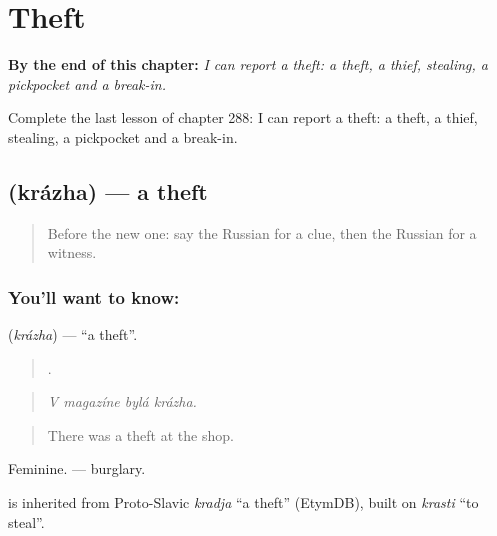 
\chapter{Theft}
\label{ch:ru-theft}

\begin{chapteropening}
\textbf{By the end of this chapter:} \emph{I can report a theft: a theft, a thief, stealing, a pickpocket and a break-in.}

Complete the last lesson of chapter 288: I can report a theft: a theft, a thief, stealing, a pickpocket and a break-in.
\end{chapteropening}

\section[\texorpdfstring{\ru{кража} (krázha)}{кража (krázha)}]{ (krázha) — a theft}

\label{lesson:RU-C288-krazha}



\begin{quote}
Before the new one: say the Russian for a clue, then the Russian for a witness.
\end{quote}

\subsection*{You'll want to know: }
\textbf{} (\emph{krázha}) — \textquotedblleft{}a theft\textquotedblright{}.

\begin{quote}
   .
\end{quote}

\begin{quote}
\emph{V magazíne bylá krázha.}
\end{quote}

\begin{quote}
There was a theft at the shop.
\end{quote}

Feminine. \emph{  } — burglary.

\begin{cousinweb}
\emph{} is inherited from Proto-Slavic \emph{kradja} \textquotedblleft{}a theft\textquotedblright{} (EtymDB), built on \emph{krasti} \textquotedblleft{}to steal\textquotedblright{}.
\end{cousinweb}

